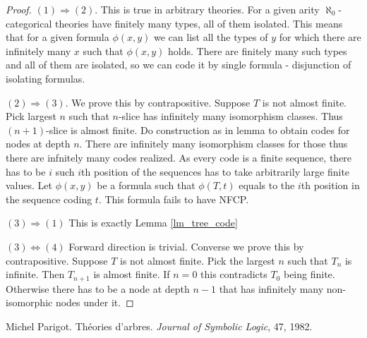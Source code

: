 \documentclass{amsart}
\begin{document}
\begin{proof}
	$(1) \Rightarrow (2)$. This is true in arbitrary theories. For a given arity $\aleph_0$-categorical theories have finitely many types, all of them isolated. This means that for a given formula $\phi(x, y)$ we can list all the types of $y$ for which there are infinitely many $x$ such that $\phi(x, y)$ holds. There are finitely many such types and all of them are isolated, so we can code it by single formula - disjunction of isolating formulas.
	
	$(2) \Rightarrow (3)$. We prove this by contrapositive. Suppose $T$ is not almost finite. Pick largest $n$ such that $n$-slice has infinitely many isomorphism classes. Thus $(n+1)$-slice is almost finite. Do construction as in lemma to obtain codes for nodes at depth $n$. There are infinitely many isomorphism classes for those thus there are infnitely many codes realized. As every code is a finite sequence, there has to be $i$ such $i$th position of the sequences has to take arbitrarily large finite values. Let $\phi(x,y)$ be a formula such that $\phi(T, t)$ equals to the $i$th position in the sequence coding $t$. This formula fails to have NFCP.
	
	$(3) \Rightarrow (1)$ This is exactly Lemma \ref{lm_tree_code} %
	
	$(3) \Leftrightarrow (4)$ Forward direction is trivial. Converse we prove this by contrapositive. Suppose $T$ is not almost finite. Pick the largest $n$ such that $T_n$ is infinite. Then $T_{n+1}$ is almost finite. If $n=0$ this contradicts $T_0$ being finite. Otherwise there has to be a node at depth $n-1$ that has infinitely many non-isomorphic nodes under it. 
\end{proof}

\begin{thebibliography}{9}

	Michel Parigot.
	Th\'eories d'arbres.
	\textit{Journal of Symbolic Logic}, 47, 1982.
	
	
\end{thebibliography}
\end{document}
